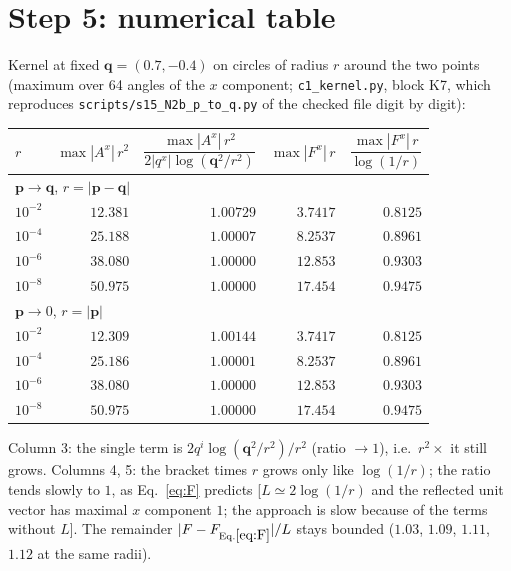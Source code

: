 \documentclass[11pt]{article}
\newcommand{\vq}{\mathbf{q}}
\newcommand{\vp}{\mathbf{p}}
\begin{document}
\section{Step 5: numerical table}
Kernel at fixed $\vq=(0.7,-0.4)$ on circles of radius $r$ around the two points (maximum over 64 angles of the $x$ component; \texttt{c1\_kernel.py}, block K7, which reproduces \texttt{scripts/s15\_N2b\_p\_to\_q.py} of the checked file digit by digit):
\begin{center}\begin{tabular}{lrrrr}\toprule
$r$ & $\max|A^{x}|\,r^{2}$ & $\dfrac{\max|A^{x}|\,r^{2}}{2|q^{x}|\log(\vq^{2}/r^{2})}$ & $\max|F^{x}|\,r$ & $\dfrac{\max|F^{x}|\,r}{\log(1/r)}$\\\midrule
\multicolumn{5}{l}{$\vp\to\vq$, $r=|\vp-\vq|$}\\
$10^{-2}$ & $12.381$ & $1.00729$ & $3.7417$ & $0.8125$\\
$10^{-4}$ & $25.188$ & $1.00007$ & $8.2537$ & $0.8961$\\
$10^{-6}$ & $38.080$ & $1.00000$ & $12.853$ & $0.9303$\\
$10^{-8}$ & $50.975$ & $1.00000$ & $17.454$ & $0.9475$\\\midrule
\multicolumn{5}{l}{$\vp\to0$, $r=|\vp|$}\\
$10^{-2}$ & $12.309$ & $1.00144$ & $3.7417$ & $0.8125$\\
$10^{-4}$ & $25.186$ & $1.00001$ & $8.2537$ & $0.8961$\\
$10^{-6}$ & $38.080$ & $1.00000$ & $12.853$ & $0.9303$\\
$10^{-8}$ & $50.975$ & $1.00000$ & $17.454$ & $0.9475$\\\bottomrule
\end{tabular}\end{center}
Column 3: the single term is $2q^{i}\log(\vq^{2}/r^{2})/r^{2}$ (ratio $\to1$), i.e.\ $r^{2}\times$ it still grows. Columns 4, 5: the bracket times $r$ grows only like $\log(1/r)$; the ratio tends slowly to $1$, as Eq.~\eqref{eq:F} predicts [$L\simeq2\log(1/r)$ and the reflected unit vector has maximal $x$ component $1$; the approach is slow because of the terms without $L$]. The remainder $|F-F_{\rm Eq.\eqref{eq:F}}|/L$ stays bounded ($1.03$, $1.09$, $1.11$, $1.12$ at the same radii).
\end{document}
